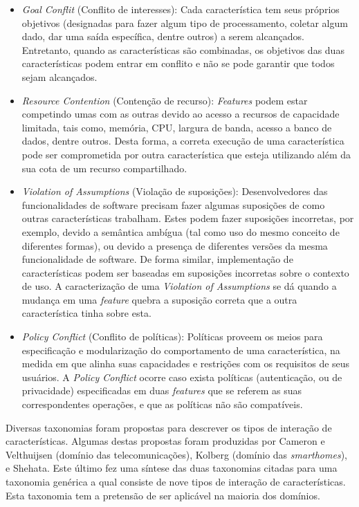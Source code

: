 \begin{itemize}
\item \textit{Goal Conflit} (Conflito de interesses): Cada característica tem seus próprios objetivos (designadas para fazer algum tipo de processamento, coletar algum dado, dar uma saída específica, dentre outros) a serem alcançados. Entretanto, quando as características são combinadas, os objetivos das duas características podem entrar em conflito e não se pode garantir que todos sejam alcançados. 
\item \textit{Resource Contention} (Contenção de recurso): \textit{Features} podem estar competindo umas com as outras devido ao acesso a recursos de capacidade limitada, tais como, memória, CPU, largura de banda, acesso a banco de dados, dentre outros. Desta forma, a correta execução de uma característica pode ser comprometida por outra característica que esteja utilizando além da sua cota de um recurso compartilhado.
\item \textit{Violation of Assumptions} (Violação de suposições): Desenvolvedores das funcionalidades de software precisam fazer algumas suposições de como outras características trabalham. Estes podem fazer suposições incorretas, por exemplo, devido a semântica ambígua (tal como uso do mesmo conceito de diferentes formas), ou devido a presença de diferentes versões da mesma funcionalidade de software. De forma similar, implementação de características podem ser baseadas em suposições incorretas sobre o contexto de uso. A caracterização de uma  \textit{Violation of Assumptions} se dá quando a mudança em uma \textit{feature} quebra a suposição correta que a outra característica tinha sobre esta.
\item \textit{Policy Conflict} (Conflito de políticas): Políticas proveem os meios para especificação e modularização do comportamento de uma característica, na medida em que alinha suas capacidades e restrições com os requisitos de seus usuários. A \textit{Policy Conflict} ocorre caso exista políticas (autenticação, ou de privacidade) especificadas em duas \textit{features} que se referem as suas correspondentes operações, e que as políticas não são compatíveis.
\end{itemize}

Diversas taxonomias foram propostas para descrever os tipos de interação de características. Algumas destas propostas foram produzidas por Cameron e Velthuijsen (domínio das telecomunicações), Kolberg (domínio das \textit{smarthomes}), e Shehata. Este último fez uma síntese das duas taxonomias citadas para uma taxonomia genérica a qual consiste de nove tipos de interação de características. Esta taxonomia tem a pretensão de ser aplicável na maioria dos domínios.\cite{NHLABATSI:2008}

